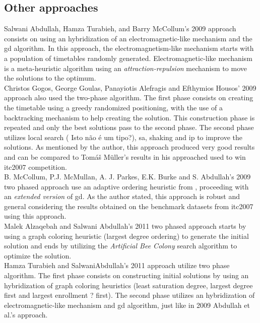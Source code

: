 \subsection{Other approaches}
\label{subsection:OtherAppr}

Salwani Abdullah, Hamza Turabieh, and Barry McCollum's 2009 approach \cite{Abdullah2009} consists on using an hybridization of an electromagnetic-like mechanism and the \gls{gd} algorithm. In this approach, the electromagnetism-like mechanism starts with a population of timetables randomly generated. Electromagnetic-like mechanism is a meta-heuristic algorithm using an \textit{attraction-repulsion} mechanism \cite{Javadian2008} to move the solutions to the optimum.\\

Christos Gogos, George Goulas, Panayiotis Alefragis and Efthymios Housos' 2009 approach \cite{Gogos2009} also used the two-phase algorithm. The first phase consists on creating the timetable using a greedy randomized positioning, with the use of a backtracking mechanism to help creating the solution. This construction phase is repeated and only the best solutions pass to the second phase. The second phase utilizes local search ({\color{red} Isto não é um tipo?}), \gls{sa}, shaking and \gls{ip} to improve the solutions. As mentioned by the author, this approach produced very good results  and can be compared to Tom\'{a}\v{s} M\"{u}ller's results in his approached used to win \gls{itc2007} competition.\\

B. McCollum, P.J. McMullan, A. J. Parkes, E.K. Burke and S. Abdullah's 2009 two phased approach \cite{McCollum2009} use an adaptive ordering heuristic from \cite{Burke2004}, proceeding with an \textit{extended version} of \gls{gd}. As the author stated, this approach is robust and general considering the results obtained on the benchmark datasets from \gls{itc2007} using this approach.\\

Malek Alzaqebah and Salwani Abdullah's 2011 two phased approach \cite{Alzaqebah2011} starts by using a graph coloring heuristic (largest degree ordering) to generate the initial solution and ends by utilizing the \textit{Artificial Bee Colony} search algorithm to optimize the solution.\\

Hamza Turabieh and SalwaniAbdullah's 2011 approach \cite{Turabieh2011} utilize two phase algorithm. The first phase consists on constructing initial solutions by using an hybridization of graph coloring heuristics (least saturation degree, largest degree first and largest enrollment {\color{red} ?} first). The second phase utilizes an hybridization of electromagnetic-like mechanism and \gls{gd} algorithm, just like in 2009 Abdullah et al.'s approach.\\

